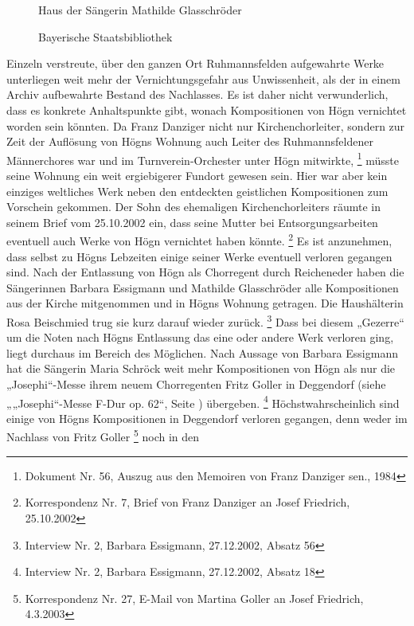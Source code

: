 \begin{figure}
\caption{Haus der Sängerin Mathilde Glasschröder}
\end{figure}

\begin{figure}
\caption{Bayerische Staatsbibliothek}
\end{figure}

Einzeln verstreute, über den ganzen Ort Ruhmannsfelden aufgewahrte Werke
unterliegen weit mehr der Vernichtungsgefahr aus Unwissenheit, als der
in einem Archiv aufbewahrte Bestand des Nachlasses. Es ist daher nicht
verwunderlich, dass es konkrete Anhaltspunkte gibt, wonach
Kompositionen von Högn vernichtet worden sein könnten. Da Franz
Danziger nicht nur Kirchenchorleiter, sondern zur Zeit der Auflösung
von Högns Wohnung auch Leiter des Ruhmannsfeldener Männerchores war und
im Turnverein-Orchester unter Högn mitwirkte, \footnote{Dokument Nr.
56, Auszug aus den Memoiren von Franz Danziger sen., 1984} müsste seine
Wohnung ein weit ergiebigerer Fundort gewesen sein. Hier war aber kein
einziges weltliches Werk neben den entdeckten geistlichen Kompositionen
zum Vorschein gekommen. Der Sohn des ehemaligen Kirchenchorleiters
räumte in seinem Brief vom 25.10.2002 ein, dass seine Mutter bei
Entsorgungsarbeiten eventuell auch Werke von Högn vernichtet haben
könnte. \footnote{Korrespondenz Nr. 7, Brief von Franz Danziger an
Josef Friedrich, 25.10.2002} Es ist anzunehmen, dass selbst zu Högns
Lebzeiten einige seiner Werke eventuell verloren gegangen sind. Nach
der Entlassung von Högn als Chorregent durch Reicheneder haben die
Sängerinnen Barbara Essigmann und Mathilde Glasschröder alle
Kompositionen aus der Kirche mitgenommen und in Högns Wohnung getragen.
Die Haushälterin Rosa Beischmied trug sie kurz darauf wieder
zurück. \footnote{Interview Nr. 2, Barbara Essigmann, 27.12.2002,
Absatz 56} Dass bei diesem „Gezerre“ um die Noten nach Högns Entlassung
das eine oder andere Werk verloren ging, liegt durchaus im Bereich des
Möglichen. Nach Aussage von Barbara Essigmann hat die Sängerin Maria
Schröck weit mehr Kompositionen von Högn als nur die „Josephi“-Messe
ihrem neuem Chorregenten Fritz Goller in Deggendorf (siehe
 „„Josephi“-Messe F-Dur op. 62“, Seite
) übergeben. \footnote{Interview Nr. 2,
Barbara Essigmann, 27.12.2002, Absatz 18} Höchstwahrscheinlich sind
einige von Högns Kompositionen in Deggendorf verloren gegangen, denn
weder im Nachlass von Fritz Goller \footnote{Korrespondenz Nr. 27,
E-Mail von Martina Goller an Josef Friedrich, 4.3.2003} noch in den
